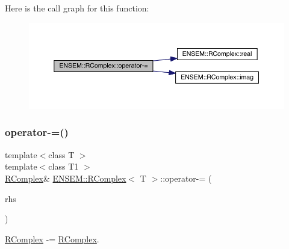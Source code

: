 Here is the call graph for this function\+:
\nopagebreak
\begin{figure}[H]
\begin{center}
\leavevmode
\includegraphics[width=350pt]{d9/d0e/classENSEM_1_1RComplex_aa2ad7391f0a0df5381ae7402b8b1fdb8_cgraph}
\end{center}
\end{figure}
\mbox{\label{classENSEM_1_1RComplex_aa2ad7391f0a0df5381ae7402b8b1fdb8}} 
\subsubsection{\texorpdfstring{operator-\/=()}{operator-=()}\hspace{0.1cm}{\footnotesize\ttfamily [6/6]}}
{\footnotesize\ttfamily template$<$class T $>$ \\
template$<$class T1 $>$ \\
\mbox{\hyperlink{classENSEM_1_1RComplex}{R\+Complex}}\& \mbox{\hyperlink{classENSEM_1_1RComplex}{E\+N\+S\+E\+M\+::\+R\+Complex}}$<$ T $>$\+::operator-\/= (\begin{DoxyParamCaption}\item[{const \mbox{\hyperlink{classENSEM_1_1RComplex}{R\+Complex}}$<$ T1 $>$ \&}]{rhs }\end{DoxyParamCaption})\hspace{0.3cm}{\ttfamily [inline]}}



\mbox{\hyperlink{classENSEM_1_1RComplex}{R\+Complex}} -\/= \mbox{\hyperlink{classENSEM_1_1RComplex}{R\+Complex}}. 

